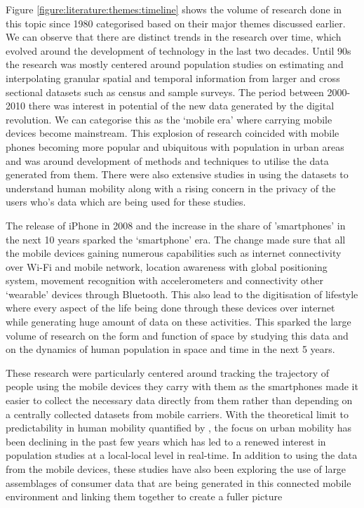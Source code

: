 Figure \ref{figure:literature:themes:timeline} shows the volume of research done in this topic since 1980 categorised based on their major themes discussed earlier.
We can observe that there are distinct trends in the research over time, which evolved around the development of technology in the last two decades.
Until 90s the research was mostly centered around population studies on estimating and interpolating granular spatial and temporal information from larger and cross sectional datasets such as census and sample surveys.
The period between 2000-2010 there was interest in potential of the new data generated by the digital revolution. 
We can categorise this as the `mobile era' where carrying mobile devices become mainstream.
This explosion of research coincided with mobile phones becoming more popular and ubiquitous with population in urban areas and was around development of methods and techniques to utilise the data generated from them.
There were also extensive studies in using the datasets to understand human mobility along with a rising concern in the privacy of the users who's data which are being used for these studies.

The release of iPhone in 2008 and the increase in the share of 'smartphones' in the next 10 years sparked the `smartphone' era. 
The change made sure that all the mobile devices gaining numerous capabilities such as internet connectivity over Wi-Fi and mobile network, location awareness with global positioning system, movement recognition with accelerometers and connectivity other `wearable' devices through Bluetooth.
This also lead to the digitisation of lifestyle where every aspect of the life being done through these devices over internet while generating huge amount of data on these activities.
This sparked the large volume of research on the form and function of space by studying this data and on the dynamics of human population in space and time in the next 5 years.


These research were particularly centered around tracking the trajectory of people using the mobile devices they carry with them as the smartphones made it easier to collect the necessary data directly from them rather than depending on a centrally collected datasets from mobile carriers. 
With the theoretical limit to predictability in human mobility quantified by \citet{song2010}, the focus on urban mobility has been declining in the past few years which has led to a renewed interest in population studies at a local-local level in real-time.
In addition to using the data from the mobile devices, these studies have also been exploring the use of large assemblages of consumer data that are being generated in this connected mobile environment and linking them together to create a fuller picture \cite{cdrc2018}

